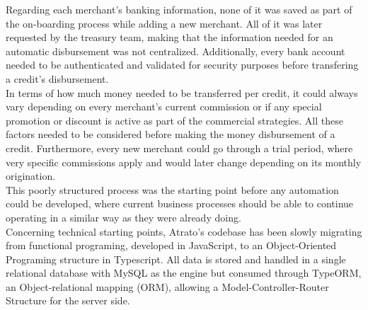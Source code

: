 Regarding each merchant’s banking information, none of it was saved as part of the on-boarding process while adding a new merchant. All of it was later requested by the treasury team, making that the information needed for an automatic disbursement was not centralized. Additionally, every bank account needed to be authenticated and validated for security purposes before transfering a credit’s disbursement.\\

In terms of how much money needed to be transferred per credit, it could always vary depending on every merchant’s current commission or if any special promotion or discount is active as part of the commercial strategies. All these factors needed to be considered before making the money disbursement of a credit. Furthermore, every new merchant could go through a trial period, where very specific commissions apply and would later change depending on its monthly origination. \\

This poorly structured process was the starting point before any automation could be developed, where current business processes should be able to continue operating in a similar way as they were already doing.\\

Concerning technical starting points, Atrato’s codebase has been slowly migrating from functional programing, developed in JavaScript, to an Object-Oriented Programing structure in Typescript. All data is stored and handled in a single relational database with MySQL as the engine but consumed through TypeORM, an Object-relational mapping (ORM), allowing a Model-Controller-Router Structure for the server side.\\
